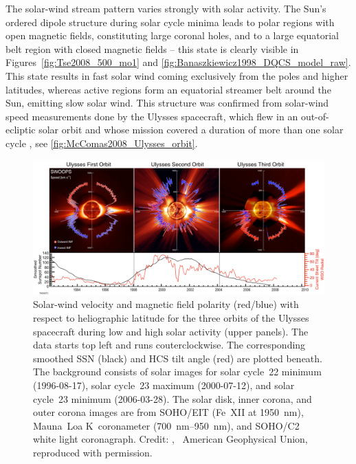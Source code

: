 The solar-wind stream pattern varies strongly with solar activity. The Sun's ordered dipole structure during solar cycle minima leads to polar regions with open magnetic fields, constituting large coronal holes, and to a large equatorial belt region with closed magnetic fields -- this state is clearly visible in Figures~\ref{fig:Tse2008_500_mo1} and \ref{fig:Banaszkiewicz1998_DQCS_model_raw}. This state results in fast solar wind coming exclusively from the poles and higher latitudes, whereas active regions form an equatorial streamer belt around the Sun, emitting slow solar wind. This structure was confirmed from solar-wind speed measurements done by the Ulysses spacecraft, which flew in an out-of-ecliptic solar orbit and whose mission covered a duration of more than one solar cycle \citep{McComas200809}, see \autoref{fig:McComas2008_Ulysses_orbit}.
\begin{figure}[htb]
	\centering
	\includegraphics[width=\textwidth]{figures_of_others/images/McComas2008_Ulysses_orbit_.png}
	\caption[Credit: {\citet[][Fig.~1]{McComas200809}}, \textcopyright~American Geophysical Union, reproduced with permission.]
	{Solar-wind velocity and magnetic field polarity (red/blue) with respect to heliographic latitude for the three orbits of the Ulysses spacecraft during low and high solar activity (upper panels). The data starts top left and runs couterclockwise. The corresponding smoothed SSN (black) and HCS tilt angle (red) are plotted beneath. The background consists of solar images for solar cycle~22 minimum (1996-08-17), solar cycle~23 maximum (2000-07-12), and solar cycle~23 minimum (2006-03-28). The solar disk, inner corona, and outer corona images are from SOHO/EIT (Fe~XII at \SI{1950}{\nano\meter}), Mauna~Loa K~coronameter (\SIrange{700}{950}{\nano\meter}), and SOHO/C2 white light coronagraph. Credit: {\citet[][Fig.~1]{McComas200809}}, \textcopyright~American Geophysical Union, reproduced with permission.}
	\label{fig:McComas2008_Ulysses_orbit}
\end{figure}
